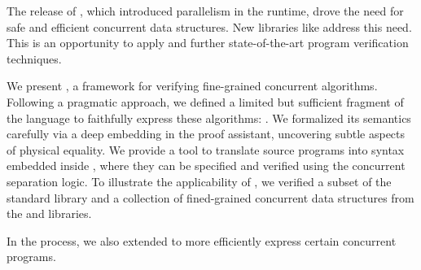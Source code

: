 The release of \OCamlFive, which introduced parallelism in the \OCaml runtime, drove the need for safe and efficient concurrent data structures.
New libraries like \Saturn address this need.
This is an opportunity to apply and further state-of-the-art program verification techniques.

We present \Zoo, a framework for verifying fine-grained concurrent \OCamlFive algorithms.
Following a pragmatic approach, we defined a limited but sufficient fragment of the language to faithfully express these algorithms: \ZooLang.
We formalized its semantics carefully via a deep embedding in the \Rocq proof assistant, uncovering subtle aspects of physical equality.
We provide a tool to translate source \OCaml programs into \ZooLang syntax embedded inside \Rocq, where they can be specified and verified using the \Iris concurrent separation logic.
To illustrate the applicability of \Zoo, we verified a subset of the standard library and a collection of fined-grained concurrent data structures from the \Saturn and \Eio libraries.

In the process, we also extended \OCaml to more efficiently express certain concurrent programs.

